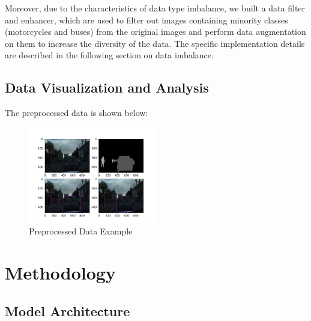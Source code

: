 \documentclass[conference]{IEEEtran}
\begin{document}

Moreover, due to the characteristics of data type imbalance, we built a data filter and enhancer, which are used to filter out images containing minority classes (motorcycles and buses) from the original images and perform data augmentation on them to increase the diversity of the data. The specific implementation details are described in the following section on data imbalance.

\subsection{Data Visualization and Analysis}

The preprocessed data is shown below:

\begin{figure}[htbp]
    \centerline{\includegraphics[width=0.5\textwidth]{fig/data.png}}
    \caption{Preprocessed Data Example}
    \label{fig:data}
\end{figure}


\section{Methodology}
\subsection{Model Architecture}

\end{document}
